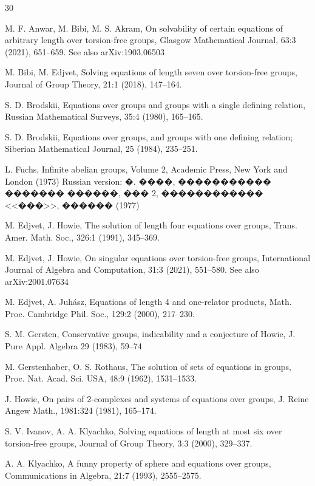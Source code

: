 \documentclass{article}
\theoremstyle{definition}
\theoremstyle{remark}
\begin{document}
\begin{thebibliography}{30}

M. F. Anwar, M. Bibi, M. S. Akram,
On solvability of certain equations of arbitrary length
over torsion-free groups,
Glasgow Mathematical Journal, 63:3 (2021), 651--659.
See also arXiv:1903.06503

M. Bibi, M. Edjvet,
Solving equations of length seven over torsion-free groups,
Journal of Group Theory, 21:1 (2018), 147--164.

S. D. Brodskii,
Equations over groups and groups with a single defining relation,
Russian Mathematical Surveys,
35:4
(1980),
165--165.

S. D. Brodskii,
Equations over groups, and groups with one defining relation;
Siberian Mathematical Journal,
25 (1984), 235--251.

L. Fuchs,
Infinite abelian groups,
Volume 2,
Academic Press,
New York and London
(1973)
Russian version:
�. ����,
����������� ������� ������,
��� 2,
������������ <<���>>,
������
(1977)
\fi


M. Edjvet, J. Howie,
The solution of length four equations over groups,
{Trans. Amer. Math.  Soc.}, {326:1} (1991), 345--369.

M. Edjvet, J. Howie,
On singular equations over torsion-free groups,
International Journal of Algebra and Computation, 31:3 (2021), 551--580.
See also arXiv:2001.07634

M. Edjvet, A. Juh\'asz,
Equations of length 4 and one-relator products,
{Math. Proc. Cambridge Phil. Soc.},
129:2 (2000), 217--230.

S. M. Gersten,
Conservative groups, indicability and a conjecture of Howie,
J. Pure Appl. Algebra
29 (1983), 59--74

M. Gerstenhaber, O. S. Rothaus,
The solution of sets of equations in groups,
{Proc. Nat. Acad. Sci. USA},
{48:9} (1962), 1531--1533.

J. Howie,
On pairs of 2-complexes and systems of equations over groups,
{J. Reine Angew Math.},
1981:324 (1981), 165--174.

S. V. Ivanov, A. A. Klyachko,
Solving equations of length at most six over torsion-free groups,
Journal of Group Theory,
3:3 (2000), 329--337.

A. A. Klyachko,
A funny property of sphere and equations over groups,
Communications in Algebra,
21:7 (1993), 2555--2575.


\end{thebibliography}
\end{document}
